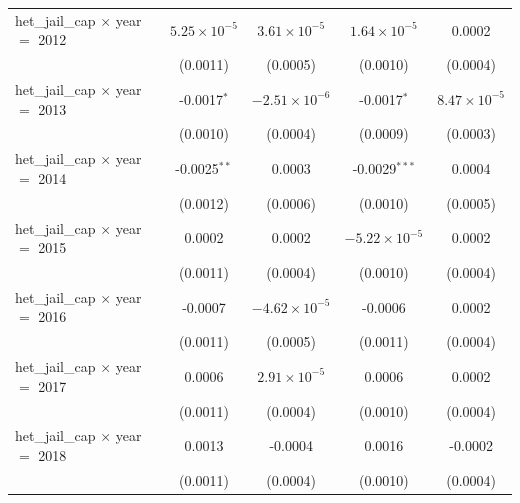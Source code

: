 \begin{tabular}{lcccc}
   het\_jail\_cap $\times$ year $=$ 2012                & $5.25\times 10^{-5}$  & $3.61\times 10^{-5}$      & $1.64\times 10^{-5}$   & 0.0002\\   
                                                        & (0.0011)              & (0.0005)                  & (0.0010)               & (0.0004)\\   
   het\_jail\_cap $\times$ year $=$ 2013                & -0.0017$^{*}$         & $-2.51\times 10^{-6}$     & -0.0017$^{*}$          & $8.47\times 10^{-5}$\\    
                                                        & (0.0010)              & (0.0004)                  & (0.0009)               & (0.0003)\\   
   het\_jail\_cap $\times$ year $=$ 2014                & -0.0025$^{**}$        & 0.0003                    & -0.0029$^{***}$        & 0.0004\\   
                                                        & (0.0012)              & (0.0006)                  & (0.0010)               & (0.0005)\\   
   het\_jail\_cap $\times$ year $=$ 2015                & 0.0002                & 0.0002                    & $-5.22\times 10^{-5}$  & 0.0002\\   
                                                        & (0.0011)              & (0.0004)                  & (0.0010)               & (0.0004)\\   
   het\_jail\_cap $\times$ year $=$ 2016                & -0.0007               & $-4.62\times 10^{-5}$     & -0.0006                & 0.0002\\   
                                                        & (0.0011)              & (0.0005)                  & (0.0011)               & (0.0004)\\   
   het\_jail\_cap $\times$ year $=$ 2017                & 0.0006                & $2.91\times 10^{-5}$      & 0.0006                 & 0.0002\\   
                                                        & (0.0011)              & (0.0004)                  & (0.0010)               & (0.0004)\\   
   het\_jail\_cap $\times$ year $=$ 2018                & 0.0013                & -0.0004                   & 0.0016                 & -0.0002\\   
                                                        & (0.0011)              & (0.0004)                  & (0.0010)               & (0.0004)\\   

\end{tabular}
